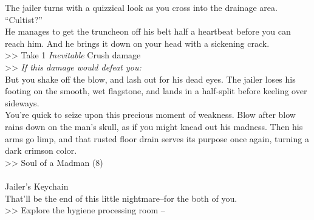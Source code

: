 The jailer turns with a quizzical look as you cross into the drainage area.\\
“Cultist?”\\

He manages to get the truncheon off his belt half a heartbeat before you can reach him. And he brings it down on your head with a sickening crack.\\
>> Take 1 \emph{Inevitable} Crush damage\\
>> \emph{If this damage would defeat you:} \\

But you shake off the blow, and lash out for his dead eyes. The jailer loses his footing on the smooth, wet flagstone, and lands in a half-split before keeling over sideways.\\

You’re quick to seize upon this precious moment of weakness. Blow after blow rains down on the man’s skull, as if you might knead out his madness. Then his arms go limp, and that rusted floor drain serves its purpose once again, turning a dark crimson color.\\
>> Soul of a Madman (8)\\
\\
 Jailer’s Keychain\\

That’ll be the end of this little nightmare--for the both of you.\\

>> Explore the hygiene processing room -- 